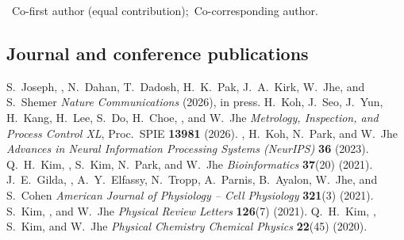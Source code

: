 
{\small\color{softgray} \cofirst~Co-first author (equal contribution);\enspace \cocorr~Co-corresponding author.}

\subsection{Journal and conference publications}
\begin{pubs}
      {S.~Joseph\cofirst, \me\cofirst, N.~Dahan, T.~Dadosh, H.~K.~Pak, J.~A.~Kirk, W.~Jhe\cocorr, and S.~Shemer\cocorr}
      {\textit{Nature Communications} (2026), in press.}
      {H.~Koh, J.~Seo, J.~Yun, H.~Kang, H.~Lee, S.~Do, H.~Choe, \me, and W.~Jhe}
      {\textit{Metrology, Inspection, and Process Control XL}, Proc.\ SPIE \textbf{13981} (2026).}
      {\me\cofirst, H.~Koh\cofirst, N.~Park, and W.~Jhe}
      {\textit{Advances in Neural Information Processing Systems (NeurIPS)} \textbf{36} (2023).}
      {Q.~H.~Kim, \me, S.~Kim, N.~Park, and W.~Jhe}
      {\textit{Bioinformatics} \textbf{37}(20) (2021).}
      {J.~E.~Gilda\cofirst, \me\cofirst, A.~Y.~Elfassy, N.~Tropp, A.~Parnis, B.~Ayalon, W.~Jhe, and S.~Cohen}
      {\textit{American Journal of Physiology -- Cell Physiology} \textbf{321}(3) (2021).}
      {S.~Kim, \me, and W.~Jhe}
      {\textit{Physical Review Letters} \textbf{126}(7) (2021).}
      {Q.~H.~Kim, \me, S.~Kim, and W.~Jhe}
      {\textit{Physical Chemistry Chemical Physics} \textbf{22}(45) (2020).}
\end{pubs}

